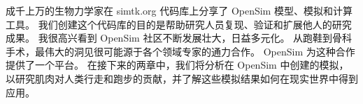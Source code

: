 成千上万的生物力学家在 simtk.org 代码库上分享了 OpenSim 模型、模拟和计算工具。
我们创建这个代码库的目的是帮助研究人员复现、验证和扩展他人的研究成果。
我很高兴看到 OpenSim 社区不断发展壮大，日益多元化。
从跑鞋到骨科手术，最伟大的洞见很可能源于各个领域专家的通力合作。
OpenSim 为这种合作提供了一个平台。
在接下来的两章中，我们将分析在 OpenSim 中创建的模拟，以研究肌肉对人类行走和跑步的贡献，并了解这些模拟结果如何在现实世界中得到应用。
